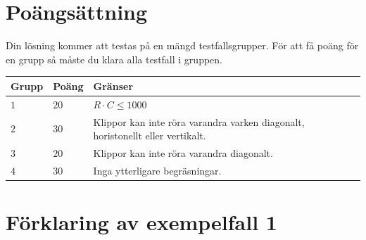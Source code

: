 \section*{Poängsättning}
Din lösning kommer att testas på en mängd testfallsgrupper.
För att få poäng för en grupp så måste du klara alla testfall i gruppen.

\noindent
\begin{tabular}{| l | l | p{12cm} |}
  \hline
  \textbf{Grupp} & \textbf{Poäng} & \textbf{Gränser} \\ \hline
  $1$    & $20$      & $R \cdot C \le 1000$ \\ \hline
  $2$    & $30$      & Klippor kan inte röra varandra varken diagonalt, horistonellt eller vertikalt. \\ \hline
  $3$    & $20$      & Klippor kan inte röra varandra diagonalt. \\ \hline
  $4$    & $30$      & Inga ytterligare begräsningar. \\ \hline
\end{tabular}

\section*{Förklaring av exempelfall 1}

